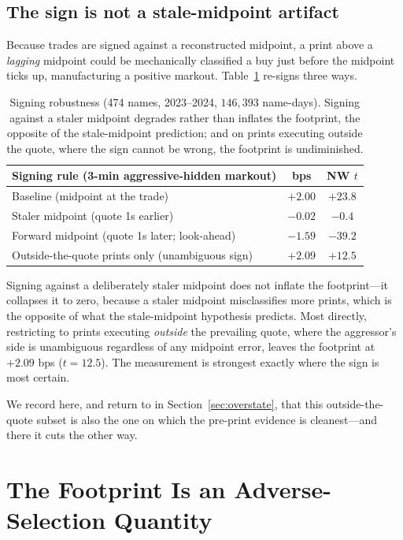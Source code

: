 \documentclass[11pt]{article}
\begin{document}
\subsection{The sign is not a stale-midpoint artifact}
\label{sec:signrobust}

Because trades are signed against a reconstructed midpoint, a print above a \emph{lagging}
midpoint could be mechanically classified a buy just before the midpoint ticks up,
manufacturing a positive markout. Table~\ref{tab:signrobust} re-signs three ways.

\begin{table}[htbp]
\centering
\begin{tabular}{lcc}
\toprule
\textbf{Signing rule (3-min aggressive-hidden markout)} & \textbf{bps} & \textbf{NW $t$} \\
\midrule
Baseline (midpoint at the trade) & $+2.00$ & $+23.8$ \\
Staler midpoint (quote 1s earlier) & $-0.02$ & $-0.4$ \\
Forward midpoint (quote 1s later; look-ahead) & $-1.59$ & $-39.2$ \\
Outside-the-quote prints only (unambiguous sign) & $+2.09$ & $+12.5$ \\
\bottomrule
\end{tabular}
\caption{Signing robustness (474 names, 2023--2024, $146{,}393$ name-days). Signing against
a staler midpoint degrades rather than inflates the footprint, the opposite of the
stale-midpoint prediction; and on prints executing outside the quote, where the sign cannot
be wrong, the footprint is undiminished.}
\label{tab:signrobust}
\end{table}

Signing against a deliberately staler midpoint does not inflate the footprint---it collapses
it to zero, because a staler midpoint misclassifies more prints, which is the opposite of
what the stale-midpoint hypothesis predicts. Most directly, restricting to prints executing
\emph{outside} the prevailing quote, where the aggressor's side is unambiguous regardless of
any midpoint error, leaves the footprint at $+2.09$ bps ($t=12.5$). The measurement is
strongest exactly where the sign is most certain.

We record here, and return to in Section~\ref{sec:overstate}, that this outside-the-quote
subset is also the one on which the pre-print evidence is cleanest---and there it cuts the
other way.

\section{The Footprint Is an Adverse-Selection Quantity}
\label{sec:adverse}
\end{document}
